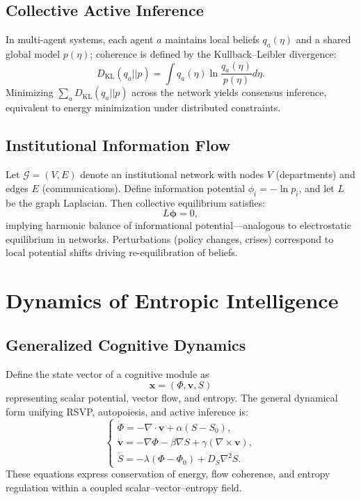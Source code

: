 \documentclass[11pt,a4paper]{article}
\begin{document}
\subsection{Collective Active Inference}

In multi-agent systems, each agent $a$ maintains local beliefs $q_a(\eta)$ and a shared global model $p(\eta)$; coherence is defined by the Kullback–Leibler divergence:
\[
D_{\mathrm{KL}}(q_a || p) = \int q_a(\eta) \ln \frac{q_a(\eta)}{p(\eta)} d\eta.
\]
Minimizing $\sum_a D_{\mathrm{KL}}(q_a || p)$ across the network yields consensus inference, equivalent to energy minimization under distributed constraints.

\subsection{Institutional Information Flow}

Let $\mathcal{G} = (V, E)$ denote an institutional network with nodes $V$ (departments) and edges $E$ (communications).  
Define information potential $\phi_i = -\ln p_i$, and let $L$ be the graph Laplacian.  
Then collective equilibrium satisfies:
\[
L \boldsymbol{\phi} = 0,
\]
implying harmonic balance of informational potential—analogous to electrostatic equilibrium in networks.  
Perturbations (policy changes, crises) correspond to local potential shifts driving re-equilibration of beliefs.

\section{Dynamics of Entropic Intelligence}
\label{app:entropic-intelligence}

\subsection{Generalized Cognitive Dynamics}

Define the state vector of a cognitive module as
\[
\mathbf{x} = (\Phi, \mathbf{v}, S)
\]
representing scalar potential, vector flow, and entropy.  
The general dynamical form unifying RSVP, autopoiesis, and active inference is:
\[
\begin{cases}
\dot{\Phi} = -\nabla \cdot \mathbf{v} + \alpha (S - S_0), \\
\dot{\mathbf{v}} = -\nabla \Phi - \beta \nabla S + \gamma (\nabla \times \mathbf{v}), \\
\dot{S} = -\lambda (\Phi - \Phi_0) + D_S \nabla^2 S.
\end{cases}
\]
These equations express conservation of energy, flow coherence, and entropy regulation within a coupled scalar–vector–entropy field.
\end{document}
